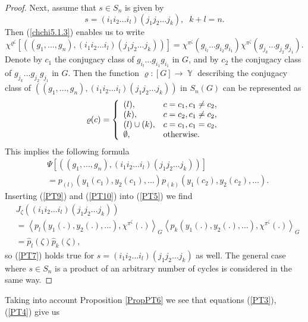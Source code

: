 \documentclass[12pt]{amsart}
\theoremstyle{definition}
\numberwithin{equation}{section}
\DeclareMathOperator{\Y}{\mathbb{Y}}
\begin{document}
\begin{proof}
Next, assume that $s\in S_n$ is given by
$$
s=(i_1i_2\ldots i_l)(j_1j_2\ldots j_k),\;\; k+l=n.
$$
Then (\ref{chchi5.1.3}) enables us to write
\begin{equation}\label{PT9}
\chi^{\varrho^{\zeta}}\left[\left((g_1,\ldots,g_n),(i_1i_2\ldots i_l)(j_1j_2\ldots j_k)\right)\right]=
\chi^{\pi^{\zeta}}(g_{i_l}\ldots g_{i_2}g_{i_1})\chi^{\pi^{\zeta}}(g_{j_k}\ldots g_{j_2}g_{j_1}).
\end{equation}
Denote by $c_1$ the conjugacy class of $g_{i_l}\ldots g_{i_1}g_{i_1}$ in $G$, and
by $c_2$ the conjugacy class of $g_{j_k}\ldots g_{j_2}g_{j_1}$ in $G$. Then the function
$\varrho: [G]\rightarrow \Y$ describing the conjugacy class of
$\left((g_1,\ldots,g_n), (i_1i_2\ldots i_l)(j_1j_2\ldots j_k)\right)$ in $S_n(G)$
can be represented as
$$
\varrho(c)=\left\{
  \begin{array}{ll}
    (l), & c=c_1, c_1\neq c_2, \\
    (k), & c=c_2,c_1\neq c_2, \\
    (l)\cup (k), & c=c_1, c_1=c_2, \\
    \emptyset, & \hbox{otherwise.}
  \end{array}
\right.
$$
This implies the following formula
\begin{equation}\label{PT10}
\begin{split}
&\Psi\left[\left((g_1,\ldots,g_n),(i_1i_2\ldots i_l)(j_1j_2\ldots j_k)\right)\right]\\
&=p_{(l)}\left(y_1(c_1),y_2(c_1),\ldots\right)p_{(k)}\left(y_1(c_2),y_2(c_2),\ldots\right).
\end{split}
\end{equation}
Inserting (\ref{PT9}) and (\ref{PT10}) into (\ref{PT5}) we find
\begin{equation}
\begin{split}
&J_{\zeta}\left((i_1i_2\ldots i_l)(j_1j_2\ldots j_k)\right)\\
&=\left<p_l\left(y_1(.),y_2(.),\ldots\right),
\chi^{\pi^{\zeta}}(.)\right>_{G}\left<p_k\left(y_1(.),y_2(.),\ldots\right),
\chi^{\pi^{\zeta}}(.)\right>_{G}\\
&=\widehat{p}_l(\zeta)\widehat{p}_k(\zeta),
\end{split}
\end{equation}
so (\ref{PT7}) holds true for $s=(i_1i_2\ldots i_l)(j_1j_2\ldots j_k)$ as well. The general case where
$s\in S_n$ is a product of an arbitrary number of cycles is considered in the same way.
\end{proof}
Taking into account  Proposition \ref{PropPT6} we see that equations (\ref{PT3}), (\ref{PT4}) give us
\end{document}
